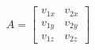 \documentclass[preview]{standalone}
\begin{document}
\begin{align*}
A = \begin{bmatrix} v_{1x} & v_{2x} \\ v_{1y} & v_{2y} \\ v_{1z} & v_{2z} \end{bmatrix}
\end{align*}
\end{document}
